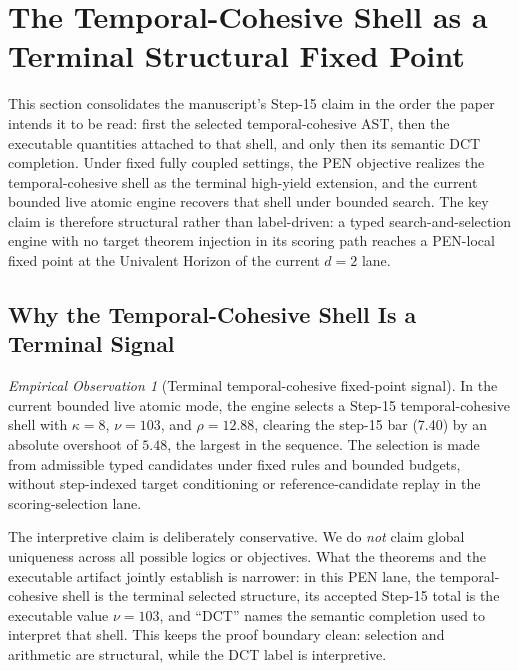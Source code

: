 \documentclass[11pt,a4paper]{article}
\theoremstyle{plain}
\theoremstyle{definition}
\theoremstyle{remark}
\newtheorem{observation}[theorem]{Empirical Observation}
\begin{document}
\section{The Temporal-Cohesive Shell as a Terminal Structural Fixed Point}
\label{sec:decomposition}
\label{sec:dct-discovery}

This section consolidates the manuscript's Step-15 claim in the order the paper intends it to be read: first the selected temporal-cohesive AST, then the executable quantities attached to that shell, and only then its semantic DCT completion.
Under fixed fully coupled settings, the PEN objective realizes the temporal-cohesive shell as the terminal high-yield extension, and the current bounded live atomic engine recovers that shell under bounded search.
The key claim is therefore structural rather than label-driven: a typed search-and-selection engine with no target theorem injection in its scoring path reaches a PEN-local fixed point at the Univalent Horizon of the current $d=2$ lane.

\subsection{Why the Temporal-Cohesive Shell Is a Terminal Signal}

\begin{observation}[Terminal temporal-cohesive fixed-point signal]
\label{thm:spectral}
In the current bounded live atomic mode, the engine selects a Step-15 temporal-cohesive shell with $\kappa=8$, $\nu=103$, and $\rho=12.88$, clearing the step-15 bar (7.40) by an absolute overshoot of $5.48$, the largest in the sequence.
The selection is made from admissible typed candidates under fixed rules and bounded budgets, without step-indexed target conditioning or reference-candidate replay in the scoring-selection lane.
\end{observation}

The interpretive claim is deliberately conservative.
We do \emph{not} claim global uniqueness across all possible logics or objectives.
What the theorems and the executable artifact jointly establish is narrower: in this PEN lane, the temporal-cohesive shell is the terminal selected structure, its accepted Step-15 total is the executable value $\nu=103$, and ``DCT'' names the semantic completion used to interpret that shell.
This keeps the proof boundary clean: selection and arithmetic are structural, while the DCT label is interpretive.
\end{document}
